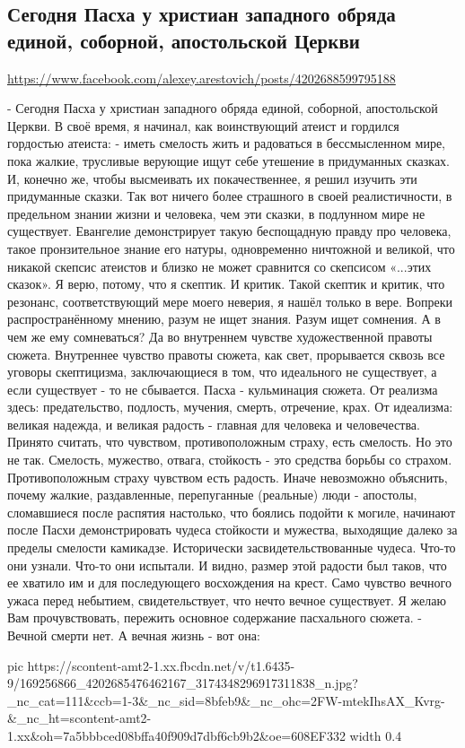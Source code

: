  
 
 
 
 

\subsection{Сегодня Пасха у христиан западного обряда единой, соборной, апостольской Церкви}
\url{https://www.facebook.com/alexey.arestovich/posts/4202688599795188}

- Сегодня Пасха у христиан западного обряда единой, соборной, апостольской Церкви. 
В своё время, я начинал, как воинствующий атеист и гордился гордостью атеиста:
- иметь смелость жить и радоваться в бессмысленном мире, пока жалкие, трусливые верующие ищут себе утешение в придуманных сказках.
И, конечно же, чтобы высмеивать их покачественнее, я решил изучить эти придуманные сказки.
Так вот ничего более страшного в своей реалистичности, в предельном знании жизни и человека, чем эти сказки, в подлунном мире не существует. 
Евангелие демонстрирует такую беспощадную правду про человека, такое пронзительное знание его натуры, одновременно ничтожной и великой, что никакой скепсис атеистов и близко не может сравнится со скепсисом «...этих сказок».
Я верю, потому, что я скептик. И критик. 
Такой скептик и критик, что резонанс, соответствующий мере моего неверия, я нашёл только в вере.
Вопреки распространённому мнению, разум не ищет знания. 
Разум ищет сомнения.
А в чем же ему сомневаться?
Да во внутреннем чувстве художественной правоты сюжета. 
Внутреннее чувство правоты сюжета, как свет, прорывается сквозь все уговоры скептицизма, заключающиеся в том, что идеального не существует, а если существует - то не сбывается. 
Пасха - кульминация сюжета.
От реализма здесь: предательство, подлость, мучения, смерть, отречение, крах. 
От идеализма: великая надежда, и великая радость - главная для человека и человечества.
Принято считать, что чувством, противоположным страху, есть смелость.
Но это не так.
Смелость, мужество, отвага, стойкость - это средства борьбы со страхом. 
Противоположным страху чувством есть радость.
Иначе невозможно объяснить, почему жалкие, раздавленные, перепуганные (реальные) люди - апостолы, сломавшиеся после распятия настолько, что боялись подойти к могиле, начинают после Пасхи демонстрировать чудеса стойкости и мужества, выходящие далеко за пределы смелости камикадзе.
Исторически засвидетельствованные чудеса.
Что-то они узнали. Что-то они испытали.
И видно, размер этой радости был таков, что ее хватило им и для последующего восхождения на крест. 
Само чувство вечного ужаса перед небытием, свидетельствует, что нечто вечное существует.
Я желаю Вам прочувствовать, пережить основное содержание пасхального сюжета.
- Вечной смерти нет. 
А вечная жизнь - вот она:


\ifcmt
  pic https://scontent-amt2-1.xx.fbcdn.net/v/t1.6435-9/169256866_4202685476462167_3174348296917311838_n.jpg?_nc_cat=111&ccb=1-3&_nc_sid=8bfeb9&_nc_ohc=2FW-mtekIhsAX_Kvrg-&_nc_ht=scontent-amt2-1.xx&oh=7a5bbbced08bffa40f909d7dbf6cb9b2&oe=608EF332
  width 0.4
\fi


